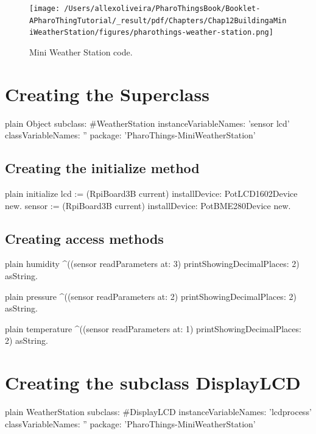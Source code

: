 \documentclass[10pt,twoside,english]{_support/latex/sbabook/sbabook}
\begin{document}
\begin{figure}

\begin{center}
\texttt{[image: /Users/allexoliveira/PharoThingsBook/Booklet-APharoThingTutorial/\_result/pdf/Chapters/Chap12BuildingaMiniWeatherStation/figures/pharothings-weather-station.png]}\caption{Mini Weather Station code.\label{MiniWeatherStationcode}}\end{center}
\end{figure}

\section{Creating the Superclass}
\begin{displaycode}{plain}
Object subclass: #WeatherStation
    instanceVariableNames: 'sensor lcd'
    classVariableNames: ''
    package: 'PharoThings-MiniWeatherStation'
\end{displaycode}
\subsection{Creating the initialize method}
\begin{displaycode}{plain}
initialize
lcd := (RpiBoard3B current) installDevice: PotLCD1602Device  new.
sensor := (RpiBoard3B current) installDevice: PotBME280Device new. 
\end{displaycode}
\subsection{Creating access methods}
\begin{displaycode}{plain}
humidity
    ^((sensor readParameters at: 3) printShowingDecimalPlaces: 2) asString. 
\end{displaycode}

\begin{displaycode}{plain}
pressure
    ^((sensor readParameters at: 2) printShowingDecimalPlaces: 2) asString. 
\end{displaycode}

\begin{displaycode}{plain}
temperature 
    ^((sensor readParameters at: 1) printShowingDecimalPlaces: 2) asString.
\end{displaycode}
\section{Creating the subclass DisplayLCD}
\begin{displaycode}{plain}
WeatherStation subclass: #DisplayLCD
    instanceVariableNames: 'lcdprocess'
    classVariableNames: ''
    package: 'PharoThings-MiniWeatherStation'
\end{displaycode}
\end{document}
